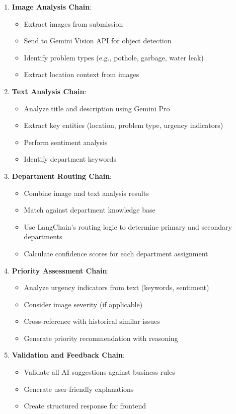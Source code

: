 \documentclass[12pt,a4paper]{article}
\begin{document}
\begin{enumerate}
    \item \textbf{Image Analysis Chain}: 
    \begin{itemize}
        \item Extract images from submission
        \item Send to Gemini Vision API for object detection
        \item Identify problem types (e.g., pothole, garbage, water leak)
        \item Extract location context from images
    \end{itemize}
    
    \item \textbf{Text Analysis Chain}:
    \begin{itemize}
        \item Analyze title and description using Gemini Pro
        \item Extract key entities (location, problem type, urgency indicators)
        \item Perform sentiment analysis
        \item Identify department keywords
    \end{itemize}
    
    \item \textbf{Department Routing Chain}:
    \begin{itemize}
        \item Combine image and text analysis results
        \item Match against department knowledge base
        \item Use LangChain's routing logic to determine primary and secondary departments
        \item Calculate confidence scores for each department assignment
    \end{itemize}
    
    \item \textbf{Priority Assessment Chain}:
    \begin{itemize}
        \item Analyze urgency indicators from text (keywords, sentiment)
        \item Consider image severity (if applicable)
        \item Cross-reference with historical similar issues
        \item Generate priority recommendation with reasoning
    \end{itemize}
    
    \item \textbf{Validation and Feedback Chain}:
    \begin{itemize}
        \item Validate all AI suggestions against business rules
        \item Generate user-friendly explanations
        \item Create structured response for frontend
    \end{itemize}
\end{enumerate}
\end{document}

